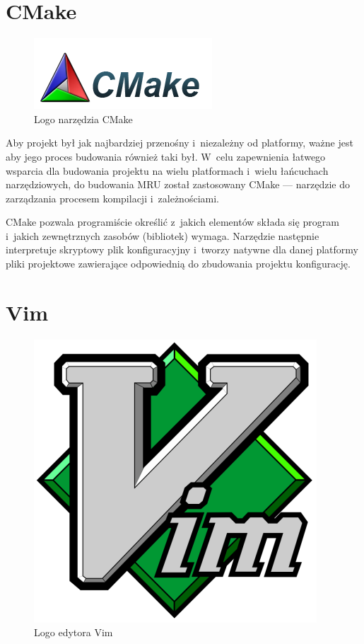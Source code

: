 \section{CMake}
\begin{figure}
\begin{center}
\includegraphics[scale=0.75]{img/cmake_logo.png}
\end{center}
\caption{Logo narzędzia CMake}
\end{figure}

\par
Aby projekt był jak najbardziej przenośny i~niezależny od platformy, ważne jest aby jego proces budowania również taki był.
W~celu zapewnienia łatwego wsparcia dla budowania projektu na wielu platformach i~wielu łańcuchach narzędziowych, do budowania MRU został zastosowany CMake --- narzędzie do zarządzania procesem kompilacji i~zależnościami.
\par
CMake pozwala programiście określić z~jakich elementów składa się program i~jakich zewnętrznych zasobów (bibliotek) wymaga. Narzędzie następnie interpretuje skryptowy plik konfiguracyjny i~tworzy natywne dla danej platformy pliki projektowe zawierające odpowiednią do zbudowania projektu konfigurację.

\section{Vim}
\begin{figure}
\begin{center}
\includegraphics[scale=0.25]{img/vim_logo.png}
\end{center}
\caption{Logo edytora Vim}
\end{figure}

